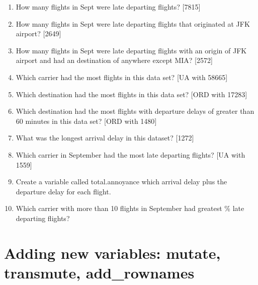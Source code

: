 \documentclass[
]{book}
\providecommand{\tightlist}{%
  \setlength{\itemsep}{0pt}\setlength{\parskip}{0pt}}
\begin{document}
\begin{enumerate}
\def\labelenumi{\arabic{enumi}.}
\tightlist
\item
  How many flights in Sept were late departing flights? {[}7815{]}
\item
  How many flights in Sept were late departing flights that originated at JFK airport? {[}2649{]}
\item
  How many flights in Sept were late departing flights with an origin of JFK airport and had an destination of anywhere except MIA? {[}2572{]}
\item
  Which carrier had the most flights in this data set? {[}UA with 58665{]}
\item
  Which destination had the most flights in this data set? {[}ORD with 17283{]}
\item
  Which destination had the most flights with departure delays of greater than 60 minutes in this data set? {[}ORD with 1480{]}
\item
  What was the longest arrival delay in this dataset? {[}1272{]}
\item
  Which carrier in September had the most late departing flights? {[}UA with 1559{]}
\item
  Create a variable called total.annoyance which arrival delay plus the departure delay for each flight.
\item
  Which carrier with more than 10 flights in September had greatest \% late departing flights?
\end{enumerate}

\hypertarget{adding-new-variables-mutate-transmute-add_rownames}{%
\section{Adding new variables: mutate, transmute, add\_rownames}\label{adding-new-variables-mutate-transmute-add_rownames}}
\end{document}
